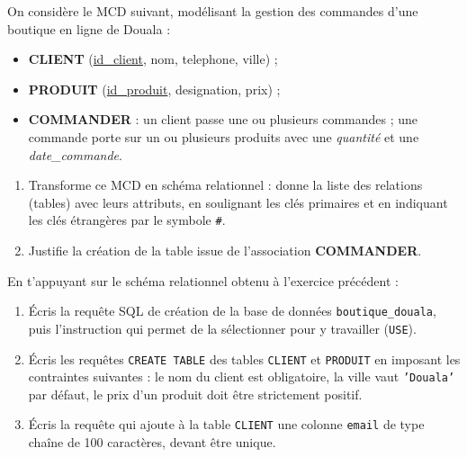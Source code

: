 \documentclass[11pt]{article}
\newcounter{popsec}
\newcounter{popsub}
\newcommand{\courssub}[1]{%
  \stepcounter{popsub}%
  \par\vspace{9pt}\noindent{\popxbold\fontsize{11.5}{13}\selectfont\color{popink}{\color{poporange}\thepopsec.\thepopsub}\hspace{6pt}#1}\par\nopagebreak\vspace{4pt}
}
\begin{document}
\courssub{Je m'entraîne}

\begin{exercice}
On considère le MCD suivant, modélisant la gestion des commandes d'une boutique en ligne de Douala :
\begin{itemize}
\item \textbf{CLIENT} (\underline{id\_client}, nom, telephone, ville) ;
\item \textbf{PRODUIT} (\underline{id\_produit}, designation, prix) ;
\item \textbf{COMMANDER} : un client passe une ou plusieurs commandes ; une commande porte sur un ou plusieurs produits avec une \emph{quantité} et une \emph{date\_commande}.
\end{itemize}
\begin{enumerate}
\item Transforme ce MCD en schéma relationnel : donne la liste des relations (tables) avec leurs attributs, en soulignant les clés primaires et en indiquant les clés étrangères par le symbole \texttt{\#}.
\item Justifie la création de la table issue de l'association \textbf{COMMANDER}.
\end{enumerate}
\end{exercice}

\begin{exercice}
En t'appuyant sur le schéma relationnel obtenu à l'exercice précédent :
\begin{enumerate}
\item Écris la requête SQL de création de la base de données \texttt{boutique\_douala}, puis l'instruction qui permet de la sélectionner pour y travailler (\texttt{USE}).
\item Écris les requêtes \texttt{CREATE TABLE} des tables \texttt{CLIENT} et \texttt{PRODUIT} en imposant les contraintes suivantes : le nom du client est obligatoire, la ville vaut \texttt{'Douala'} par défaut, le prix d'un produit doit être strictement positif.
\item Écris la requête qui ajoute à la table \texttt{CLIENT} une colonne \texttt{email} de type chaîne de 100 caractères, devant être unique.
\end{enumerate}
\end{exercice}
\end{document}
